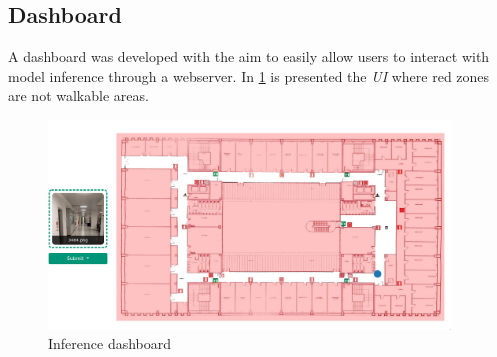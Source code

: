 \subsection{Dashboard}
A dashboard was developed with the aim to easily allow users to interact with model inference through a webserver. In \cref{fig:dashboard} is presented the \textit{UI} where red zones are not walkable areas.
\begin{figure}
    \begin{center}
        \includegraphics[width=0.95\textwidth]{./imgs/dashboard.png}
    \end{center}
    \caption{Inference dashboard}
    \label{fig:dashboard}
\end{figure}




